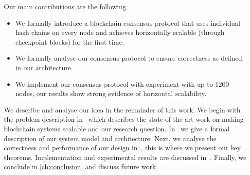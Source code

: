 Our main contributions are the following.
\begin{itemize}
    \item We formally introduce a blockchain consensus protocol that uses individual hash chains on every node and achieves
        horizontally scalable (through checkpoint blocks) for the first time.
    \item We formally analyse our consensus protocol to ensure correctness as defined in our architecture.
    \item We implement our consensus protocol with experiment with up to 1200 nodes,
        our results show strong evidence of horizontal scalability.
\end{itemize}

We describe and analyse our idea in the remainder of this work.
We begin with the problem description in~ which describes the state-of-the-art work on making blockchain systems scalable and our research question.
In~ we give a formal description of our system model and architecture.
Next, we analyse the correctness and performance of our design in~, this is where we present our key theorems.
Implementation and experimental results are discussed in~.
Finally, we conclude in \ref{ch:conclusion} and discuss future work.
